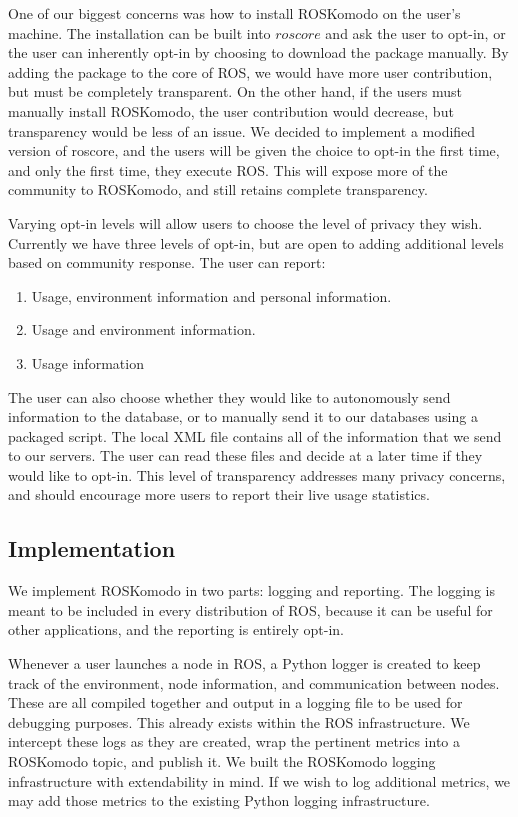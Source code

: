 \documentclass[letterpaper, 10 pt, conference]{ieeeconf}  %
\begin{document}
One of our biggest concerns was how to install ROSKomodo on the user's machine. The installation can be built into $roscore$ and ask the user to opt-in, or the user can inherently opt-in by choosing to download the package manually. By adding the package to the core of ROS, we would have more user contribution, but must be completely transparent. On the other hand, if the users must manually install ROSKomodo, the user contribution would decrease, but transparency would be less of an issue. We decided to implement a modified version of roscore, and the users will be given the choice to opt-in the first time, and only the first time, they execute ROS. This will expose more of the community to ROSKomodo, and still retains complete transparency.

Varying opt-in levels will allow users to choose the level of privacy they wish. Currently we have three levels of opt-in, but are open to adding additional levels based on community response. The user can report:

\begin{enumerate}
\item Usage, environment information and personal information.
\item Usage and environment information.
\item Usage information
\end{enumerate}
The user can also choose whether they would like to autonomously send information to the database, or to manually send it to our databases using a packaged script. The local XML file contains all of the information that we send to our servers. The user can read these files and decide at a later time if they would like to opt-in. This level of transparency addresses many privacy concerns, and should encourage more users to report their live usage statistics. 


\subsection{Implementation}

We implement ROSKomodo in two parts: logging and reporting. The logging is meant to be included in every distribution of ROS, because it can be useful for other applications, and the reporting is entirely opt-in.

Whenever a user launches a node in ROS, a Python logger is created to keep track of the environment, node information, and communication between nodes. These are all compiled together and output in a logging file to be used for debugging purposes. This already exists within the ROS infrastructure. We intercept these logs as they are created, wrap the pertinent metrics into a ROSKomodo topic, and publish it. We built the ROSKomodo logging infrastructure with extendability in mind. If we wish to log additional metrics, we may add those metrics to the existing Python logging infrastructure.
\end{document}
